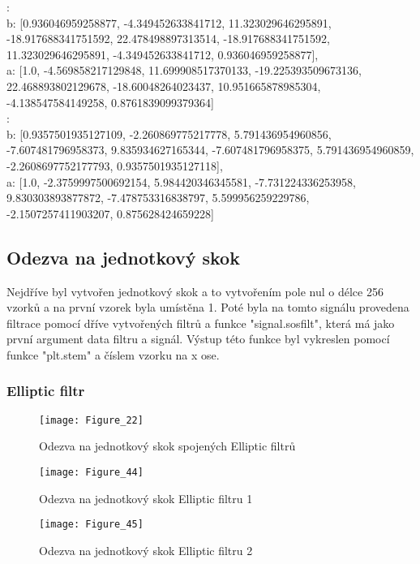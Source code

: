 :\\
b: [0.936046959258877, -4.349452633841712, 11.323029646295891, -18.917688341751592, 22.478498897313514, -18.917688341751592, 11.323029646295891, -4.349452633841712, 0.936046959258877],\\
a: [1.0, -4.569858217129848, 11.699908517370133, -19.225393509673136, 22.468893802129678, -18.60048264023437, 10.951665878985304, -4.138547584149258, 0.8761839099379364]\\

:\\
b: [0.9357501935127109, -2.260869775217778, 5.791436954960856, -7.607481796958373, 9.835934627165344, -7.607481796958375, 5.791436954960859, -2.2608697752177793, 0.9357501935127118],\\
a: [1.0, -2.3759997500692154, 5.984420346345581, -7.731224336253958, 9.830303893877872, -7.478753316838797, 5.599956259229786, -2.1507257411903207, 0.875628424659228]\\

\subsection{Odezva na jednotkový skok}
Nejdříve byl vytvořen jednotkový skok a to vytvořením pole nul o délce 256 vzorků a na první vzorek byla umístěna 1.
Poté byla na tomto signálu provedena filtrace pomocí dříve vytvořených filtrů a funkce "signal.sosfilt", která má jako první argument data filtru a signál.
Výstup této funkce byl vykreslen pomocí funkce "plt.stem" a číslem vzorku na x ose.

\subsubsection{Elliptic filtr}

\begin{figure}[H] 
	\centering
	\texttt{[image: Figure\_22]}
	\caption{Odezva na jednotkový skok spojených Elliptic filtrů}
\end{figure}

\begin{figure}[H] 
	\centering
	\texttt{[image: Figure\_44]}
	\caption{Odezva na jednotkový skok Elliptic filtru 1}
\end{figure}

\begin{figure}[H] 
	\centering
	\texttt{[image: Figure\_45]}
	\caption{Odezva na jednotkový skok Elliptic filtru 2}
\end{figure}

